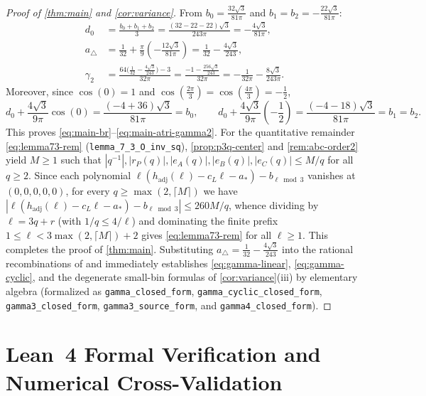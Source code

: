 \documentclass[11pt,a4paper]{article}
\numberwithin{equation}{section}
\theoremstyle{plain}
\theoremstyle{definition}
\theoremstyle{remark}
\newcommand{\hadj}{h_{\mathrm{adj}}}
\newcommand{\tri}{a_{\triangle}}
\newcommand{\code}[1]{\texttt{\small #1}}
\begin{document}
\begin{proof}[Proof of \cref{thm:main} and \cref{cor:variance}]
From $b_0=\frac{32\sqrt{3}}{81\pi}$ and $b_1=b_2=-\frac{22\sqrt{3}}{81\pi}$:
\begin{align*}
  d_0 &= \frac{b_0+b_1+b_2}{3} = \frac{(32-22-22)\sqrt{3}}{243\pi} = -\frac{4\sqrt{3}}{81\pi},\\
  \tri &= \frac{1}{32} + \frac{\pi}{9}\left(-\frac{12\sqrt{3}}{81\pi}\right) = \frac{1}{32} - \frac{4\sqrt{3}}{243},\\
  \gamma_2 &= \frac{64\bigl(\frac{1}{32}-\frac{4\sqrt{3}}{243}\bigr)-3}{32\pi}
            = \frac{-1 - \frac{256\sqrt{3}}{243}}{32\pi}
            = -\frac{1}{32\pi} - \frac{8\sqrt{3}}{243\pi}.
\end{align*}
Moreover, since $\cos(0)=1$ and $\cos(\frac{2\pi}{3})=\cos(\frac{4\pi}{3})=-\frac{1}{2}$,
\[
  d_0 + \frac{4\sqrt{3}}{9\pi}\cos(0) = \frac{(-4+36)\sqrt{3}}{81\pi} = b_0,
  \qquad
  d_0 + \frac{4\sqrt{3}}{9\pi}\left(-\frac{1}{2}\right) = \frac{(-4-18)\sqrt{3}}{81\pi} = b_1 = b_2.
\]
This proves \eqref{eq:main-br}--\eqref{eq:main-atri-gamma2}. For the quantitative remainder \eqref{eq:lemma73-rem} (\code{lemma\_7\_3\_O\_inv\_sq}), \cref{prop:p3q-center} and \cref{rem:abc-order2} yield $M\ge 1$ such that $|q^{-1}|,|r_P(q)|,|e_A(q)|,|e_B(q)|,|e_C(q)|\le M/q$ for all $q\ge 2$. Since each polynomial $\ell(\hadj(\ell)-c_L\ell-a_*)-b_{\ell\bmod 3}$ vanishes at $(0,0,0,0,0)$, for every $q\ge \max(2,\lceil M\rceil)$ we have $|\ell(\hadj(\ell)-c_L\ell-a_*)-b_{\ell\bmod 3}|\le 260M/q$, whence dividing by $\ell=3q+r$ (with $1/q\le 4/\ell$) and dominating the finite prefix $1\le\ell<3\max(2,\lceil M\rceil)+2$ gives \eqref{eq:lemma73-rem} for all $\ell\ge 1$. This completes the proof of \cref{thm:main}. Substituting $\tri=\frac{1}{32}-\frac{4\sqrt{3}}{243}$ into the rational recombinations of \cite[Theorem~7.6, \S7.2, \S8]{banic_elezovic_p2} and \cite[Theorem~3.10]{banic_elezovic_p5} immediately establishes \eqref{eq:gamma-linear}, \eqref{eq:gamma-cyclic}, and the degenerate small-bin formulas of \cref{cor:variance}(iii) by elementary algebra (formalized as \code{gamma\_closed\_form}, \code{gamma\_cyclic\_closed\_form}, \code{gamma3\_closed\_form}, \code{gamma3\_source\_form}, and \code{gamma4\_closed\_form}).
\end{proof}

\section{Lean~4 Formal Verification and Numerical Cross-Validation}
\label{sec:verification}
\end{document}
